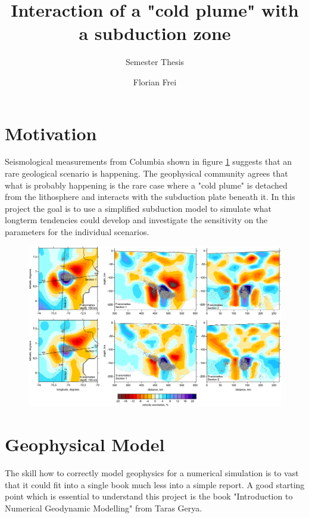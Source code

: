 \documentclass[12pt]{scrartcl}
\begin{document}
\title{Interaction of a "cold plume" with a subduction zone}
\subtitle{Semester Thesis}
\author{Florian Frei}

\maketitle

\newpage

\tableofcontents

\newpage

\section{Motivation}
Seismological measurements from Columbia shown in figure \ref{fig:seism_data} suggests that an rare geological scenario is happening. The geophysical community agrees that what is probably happening is the rare case where a "cold plume" is detached from the lithosphere and interacts with the subduction plate beneath it. In this project the goal is to use a simplified subduction model to simulate what longterm tendencies could develop and investigate the sensitivity on the parameters for the individual scenarios.
\begin{figure}
\includegraphics[scale=0.45]{deep_anomaly_hor_ver.png}
\label{fig:seism_data}
\end{figure}

\section{Geophysical Model}
The skill how to correctly model geophysics for a numerical simulation is to vast that it could fit into a single book much less into a simple report. A good starting point which is essential to understand this project is the book "Introduction to Numerical Geodynamic Modelling" \cite{gerya2009introduction} from Taras Gerya.
\end{document}
